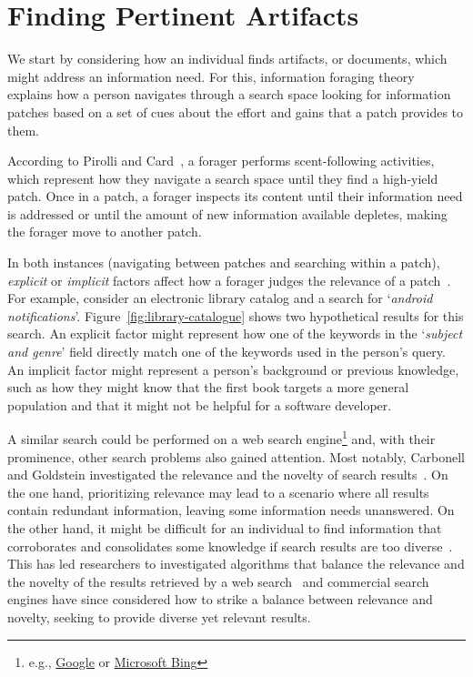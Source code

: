 


\section{Finding Pertinent Artifacts}
\label{cp2:searching}


We start by considering how an individual finds 
artifacts, or documents, which might 
address an information need. 
For this, information foraging theory~\cite{Pirolli1999} explains how a person navigates through  
a search space looking for information patches  based on 
a set of cues about the effort and gains that a patch provides to them.


According to Pirolli and Card~\cite{Pirolli1999}, a forager performs scent-following activities, which represent 
how they navigate a search space until they find a high-yield patch. 
Once in a patch, a forager inspects its content until their information need is addressed or until the amount of new information available depletes, making the forager move to another patch. 


In both instances (navigating between patches and searching within a patch), \textit{explicit} or \textit{implicit} factors affect how a forager judges the relevance of a patch~\cite{saracevic1975}.
For example,
consider an electronic library catalog and a search for `\textit{android notifications}'.
Figure~\ref{fig:library-catalogue} shows two hypothetical results for this search. %
An explicit factor might represent how one of the keywords in the `\textit{subject and genre}' field
directly match one of the keywords used in the person's query. An implicit factor might represent 
a person's background or previous knowledge, such as how 
they might know that the first book targets a more general population and 
that it might not be helpful for a software developer.







A similar search could be performed on a web search engine\footnote{e.g., \href{https://www.google.com/}{Google} or \href{https://www.bing.com/}{Microsoft Bing}}
and, with their prominence, other search problems also gained attention.
Most notably,  Carbonell and Goldstein investigated the relevance and the novelty of search results~\cite{Carbonell1998}.
On the one hand, prioritizing relevance may lead to a scenario where all results contain redundant information, leaving some information needs unanswered. 
On the other hand, it might be difficult for an individual 
to find information that corroborates and consolidates some knowledge if search results are too diverse~\cite{clark2013relevance}.  
This has led researchers to investigated 
algorithms that balance the relevance and the novelty of the results retrieved
by a web search~\cite{najork2001, rafiei2010, vieira2011}
and commercial search engines have since considered how to strike a balance
between relevance and novelty, seeking to provide diverse  
yet relevant results.



